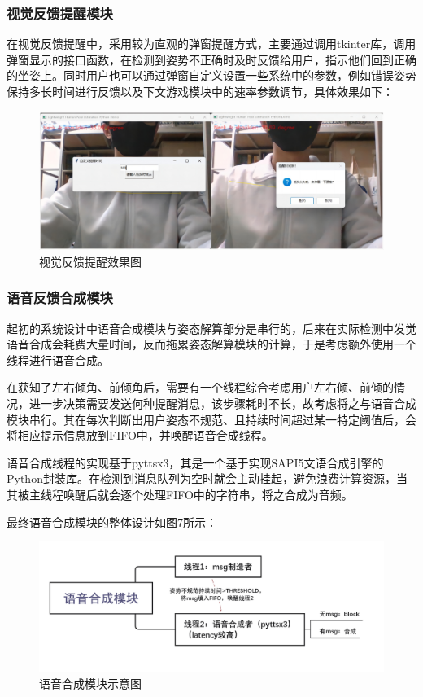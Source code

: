 \documentclass[12pt,a4paper]{article}%
\begin{document}
\subsubsection{视觉反馈提醒模块}
在视觉反馈提醒中，采用较为直观的弹窗提醒方式，主要通过调用tkinter库，调用弹窗显示的接口函数，在检测到姿势不正确时及时反馈给用户，指示他们回到正确的坐姿上。同时用户也可以通过弹窗自定义设置一些系统中的参数，例如错误姿势保持多长时间进行反馈以及下文游戏模块中的速率参数调节，具体效果如下：

\begin{figure}[H]
\centering
\includegraphics[width=.9\textwidth]{./Part3-Design.pic/vis-feedback.png}
\caption{视觉反馈提醒效果图}
\end{figure}

\subsubsection{语音反馈合成模块}
起初的系统设计中语音合成模块与姿态解算部分是串行的，后来在实际检测中发觉语音合成会耗费大量时间，反而拖累姿态解算模块的计算，于是考虑额外使用一个线程进行语音合成。
\par
在获知了左右倾角、前倾角后，需要有一个线程综合考虑用户左右倾、前倾的情况，进一步决策需要发送何种提醒消息，该步骤耗时不长，故考虑将之与语音合成模块串行。其在每次判断出用户姿态不规范、且持续时间超过某一特定阈值后，会将相应提示信息放到FIFO中，并唤醒语音合成线程。
\par
语音合成线程的实现基于pyttsx3，其是一个基于实现SAPI5文语合成引擎的Python封装库。在检测到消息队列为空时就会主动挂起，避免浪费计算资源，当其被主线程唤醒后就会逐个处理FIFO中的字符串，将之合成为音频。
\par
最终语音合成模块的整体设计如图7所示：

\begin{figure}[H]
\centering
\includegraphics[width=.9\textwidth]{./Part3-Design.pic/image-20230102171618315.png}
\caption{语音合成模块示意图}
\end{figure}
\end{document}
